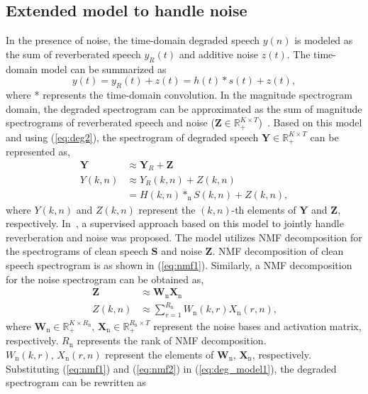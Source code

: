 \subsection{Extended model to handle noise}
In the presence of noise, the time-domain degraded speech $y(n)$ is modeled as the sum of reverberated speech $y_R(t)$ and additive noise $z(t)$. The time-domain model can be summarized as
\begin{equation}
y(t)=y_R(t)+z(t) = h(t)*s(t)+z(t),
\label{eq:time_domain_model}
\end{equation} 
where * represents the time-domain convolution. In the magnitude spectrogram domain, the degraded spectrogram can be approximated as the sum of magnitude spectrograms of reverberated speech and noise ($\mathbf{Z}\in \mathbb{R}_+^{K \times T}$)~\cite{baby2015coupled, baby2016phd, baby2017joint}. Based on this model and using (\ref{eq:deg2}), the spectrogram of degraded speech $\mathbf{Y}\in \mathbb{R}_+^{K \times T}$ can be represented as, 
\begin{align}
\mathbf{Y}&\approx \mathbf{Y}_R + \mathbf{Z}\nonumber\\
Y(k,n)&\approx Y_R(k,n) + Z(k,n) \nonumber\\
      &= H(k,n)*_{\text{n}} S(k,n)+Z(k,n),
\label{eq:deg_model1}
\end{align}
where $Y(k,n)$ and $Z(k,n)$ represent the $(k,n)$-th elements of $\mathbf{Y}$ and $\mathbf{Z}$, respectively. In~\cite{baby2015coupled}, a supervised approach based on this model to jointly handle reverberation and noise was proposed. The model utilizes NMF decomposition for the spectrograms of clean speech $\mathbf{S}$ and noise $\mathbf{Z}$. NMF decomposition of clean speech spectrogram is as shown in (\ref{eq:nmf1}). Similarly, a NMF decomposition for the noise spectrogram can be obtained as,
\begin{align}
\mathbf{Z}&\approx \mathbf{W}_{\text{n}} \mathbf{X}_{\text{n}}\nonumber\\
Z(k,n)&\approx\sum_{r=1}^{R_{\text{n}}} W_{\text{n}}(k,r)X_{\text{n}}(r,n)\text{,}
\label{eq:nmf2}
\end{align}
where $\mathbf{W}_{\text{n}}\in \mathbb{R}_+^{K \times R_{\text{n}}} \text{, }  \mathbf{X}_{\text{n}}\in \mathbb{R}_+^{R_{\text{n}} \times T}$ represent the noise bases and activation matrix, respectively. $R_{\text{n}}$ represents the rank of NMF decomposition. $W_{\text{n}}(k,r) \text{, } X_{\text{n}}(r,n)$ represent the elements of $\mathbf{W}_{\text{n}}\text{, }\mathbf{X}_{\text{n}}$, respectively. Substituting (\ref{eq:nmf1}) and (\ref{eq:nmf2}) in (\ref{eq:deg_model1}), the degraded spectrogram can be rewritten as
